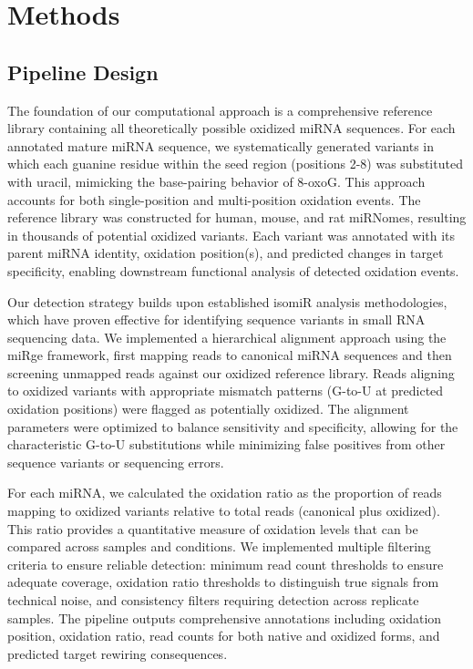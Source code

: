 \section{Methods}

\subsection{Pipeline Design}

The foundation of our computational approach is a comprehensive reference library containing all theoretically possible oxidized miRNA sequences. For each annotated mature miRNA sequence, we systematically generated variants in which each guanine residue within the seed region (positions 2-8) was substituted with uracil, mimicking the base-pairing behavior of 8-oxoG. This approach accounts for both single-position and multi-position oxidation events. The reference library was constructed for human, mouse, and rat miRNomes, resulting in thousands of potential oxidized variants. Each variant was annotated with its parent miRNA identity, oxidation position(s), and predicted changes in target specificity, enabling downstream functional analysis of detected oxidation events.

Our detection strategy builds upon established isomiR analysis methodologies, which have proven effective for identifying sequence variants in small RNA sequencing data. We implemented a hierarchical alignment approach using the miRge framework, first mapping reads to canonical miRNA sequences and then screening unmapped reads against our oxidized reference library. Reads aligning to oxidized variants with appropriate mismatch patterns (G-to-U at predicted oxidation positions) were flagged as potentially oxidized. The alignment parameters were optimized to balance sensitivity and specificity, allowing for the characteristic G-to-U substitutions while minimizing false positives from other sequence variants or sequencing errors.

For each miRNA, we calculated the oxidation ratio as the proportion of reads mapping to oxidized variants relative to total reads (canonical plus oxidized). This ratio provides a quantitative measure of oxidation levels that can be compared across samples and conditions. We implemented multiple filtering criteria to ensure reliable detection: minimum read count thresholds to ensure adequate coverage, oxidation ratio thresholds to distinguish true signals from technical noise, and consistency filters requiring detection across replicate samples. The pipeline outputs comprehensive annotations including oxidation position, oxidation ratio, read counts for both native and oxidized forms, and predicted target rewiring consequences.

